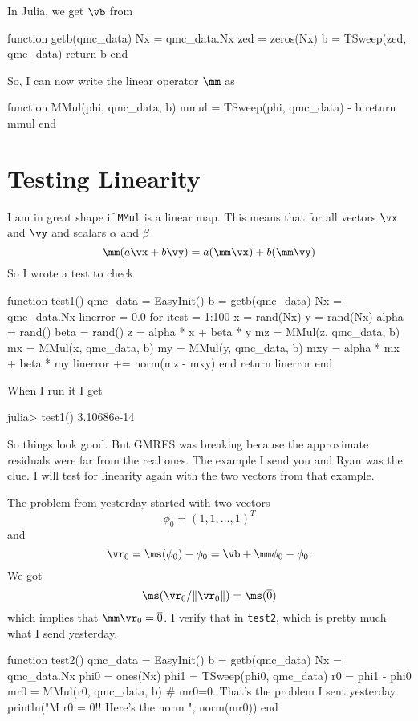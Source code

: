 \documentclass[12pt]{siamltex}
\begin{document}
In Julia, we get $\vb$ from
\begin{code}
function getb(qmc_data)
    Nx = qmc_data.Nx
    zed = zeros(Nx)
    b = TSweep(zed, qmc_data)
    return b
end
\end{code}

So, I can now write the linear operator $\mm$ as
\begin{code}
function MMul(phi, qmc_data, b)
    mmul = TSweep(phi, qmc_data) - b
    return mmul
end
\end{code}

\section{Testing Linearity}

I am in great shape if {\tt MMul} is a linear map. This means that for
all vectors $\vx$ and $\vy$ and scalars $\alpha$ and $\beta$
\[
\mm(a \vx + b \vy) = a (\mm \vx) + b (\mm \vy)
\]
So I wrote a test to check
\begin{code}
function test1()
    qmc_data = EasyInit()
    b = getb(qmc_data)
    Nx = qmc_data.Nx
    linerror = 0.0
    for itest = 1:100
        x = rand(Nx)
        y = rand(Nx)
        alpha = rand()
        beta = rand()
        z = alpha * x + beta * y
        mz = MMul(z, qmc_data, b)
        mx = MMul(x, qmc_data, b)
        my = MMul(y, qmc_data, b)
        mxy = alpha * mx + beta * my
        linerror += norm(mz - mxy)
    end
    return linerror
end
\end{code}

When I run it I get
\begin{code}
julia> test1()
3.10686e-14
\end{code}

So things look good. But GMRES was breaking because the approximate
residuals were far from the real ones. The example I send you and Ryan
was the clue. I will test for linearity again with the two vectors from
that example. 

The problem from yesterday started with two vectors
\[
\phi_0 = (1, 1, \dots, 1)^T
\]
and
\[
\vr_0 = \ms(\phi_0) - \phi_0 = \vb + \mm \phi_0 - \phi_0.
\]
We got 
\[
\ms(\vr_0/\| \vr_0 \|) = \ms({\overline 0})
\]
which implies that $\mm \vr_0 = {\overline 0}$. 
I verify that in {\tt test2}, which
is pretty much what I send yesterday.

\begin{code}
function test2()
    qmc_data = EasyInit()
    b = getb(qmc_data)
    Nx = qmc_data.Nx
    phi0 = ones(Nx)
    phi1 = TSweep(phi0, qmc_data)
    r0 = phi1 - phi0
    mr0 = MMul(r0, qmc_data, b)
    # mr0=0. That's the problem I sent yesterday.
    println("M r0 = 0!! Here's the norm ", norm(mr0))
end
\end{code}
\end{document}
